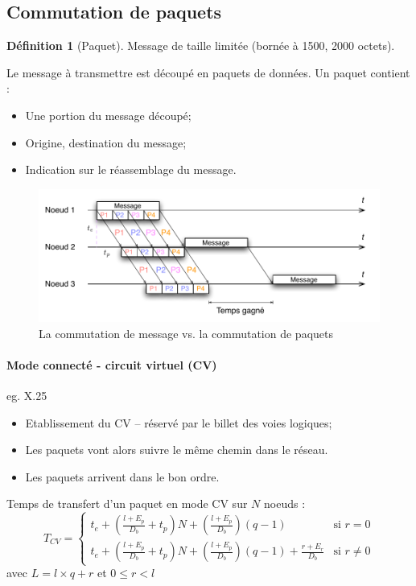 \documentclass[11pt,english,french]{scrreprt}
\theoremstyle{remark}
\theoremstyle{definition}
\newtheorem*{def*}{Définition}
\begin{document}
\subsection{Commutation de paquets} %

\begin{def*}[Paquet]
	Message de taille limitée (bornée à 1500, 2000 octets).
	
	Le message à transmettre est découpé en paquets de données. Un paquet contient :\begin{itemize}
		\item Une portion du message découpé;
		\item Origine, destination du message;
		\item Indication sur le réassemblage du message.
	\end{itemize}
\end{def*}

\begin{figure}[h]
	\center
	\includegraphics[scale=.75]{graphes/CV-CC}
	\caption{La commutation de message vs. la commutation de paquets}
\end{figure}

\paragraph{Mode connecté - circuit virtuel (CV)} %
eg. X.25
\begin{itemize}
	\item Etablissement du CV -- réservé par le billet des voies logiques;
	\item Les paquets vont alors suivre le même chemin dans le réseau.
	\item Les paquets arrivent dans le bon ordre.
\end{itemize}

Temps de transfert d'un paquet en mode CV sur $N$ noeuds :
\[
	T_{CV}=\begin{cases}
		t_{e}+\left(\frac{l+E_{p}}{D_{b}}+t_{p}\right)N+\left(\frac{l+E_{p}}{D_{b}}\right)\left(q-1\right) & \textrm{si }r=0\\
		t_{e}+\left(\frac{l+E_{p}}{D_{b}}+t_{p}\right)N+\left(\frac{l+E_{p}}{D_{b}}\right)\left(q-1\right)+\frac{r+E_{r}}{D_{b}} & \textrm{si }r\ne0
	\end{cases}
\] avec $L=l\times q+r$ et $0\leqslant r<l$
\end{document}
